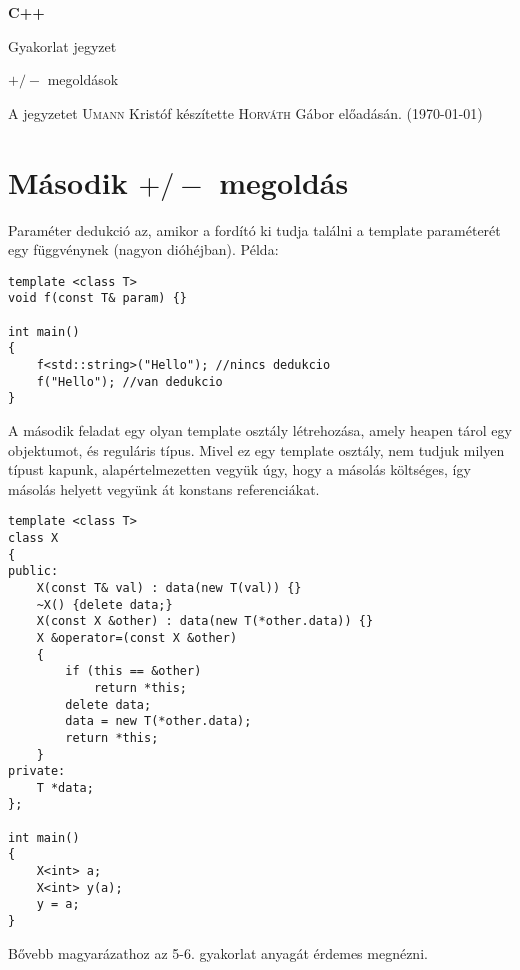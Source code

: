 \documentclass[a4paper,11.5pt]{article}
\begin{document}
	\setlength\parindent{0pt}
	\def\s{\hspace{0.2mm}\vphantom{\beta}}
	\def\Z{\mathbb{Z}}
	\def\Q{\mathbb{Q}}
	\def\R{\mathbb{R}}
	\def\C{\mathbb{C}}
	\def\N{\mathbb{N}}
	\def\Ra{\overline{\mathbb{R}}}
	
	\def\sume{\displaystyle\sum_{n=1}^{+\infty}}
	\def\sumn{\displaystyle\sum_{n=0}^{+\infty}}
	
	\def\narrow{\underset{n\rightarrow+\infty}{\longrightarrow}}
	\def\limn{\displaystyle\lim_{n\to +\infty}}
	\def\limx{\displaystyle\lim_{x\to +\infty}}
	
	\theoremstyle{definition}
	\newtheorem{theorem}{Tétel}[subsection] 
	
	\theoremstyle{definition}
	\newtheorem{definition}[theorem]{Definíció} 
	\newtheorem{example}[theorem]{Példa} 
	\newtheorem{task}[theorem]{Feladat} 
	\newtheorem{note}[theorem]{Megjegyzés}
	\begin{center}
		{\LARGE\textbf{C++}}
		
		{\Large Gyakorlat jegyzet}
		
		$+/-$ megoldások
	\end{center}A jegyzetet \textsc{Umann} Kristóf készítette \textsc{Horváth} Gábor  előadásán. (\today)
	\section{Második $+/-$ megoldás}
	Paraméter dedukció az, amikor a fordító ki tudja találni a template paraméterét egy függvénynek (nagyon dióhéjban). Példa:
	\begin{lstlisting}
template <class T>
void f(const T& param) {}

int main()
{
	f<std::string>("Hello"); //nincs dedukcio
	f("Hello"); //van dedukcio
}
	\end{lstlisting}
	
	A második feladat egy olyan template osztály létrehozása, amely heapen tárol egy objektumot, és reguláris típus. Mivel ez egy template osztály, nem tudjuk milyen típust kapunk, alapértelmezetten vegyük úgy, hogy a másolás költséges, így másolás helyett vegyünk át konstans referenciákat.
	\begin{lstlisting}
template <class T>
class X
{
public:
	X(const T& val) : data(new T(val)) {}
	~X() {delete data;}
	X(const X &other) : data(new T(*other.data)) {}
	X &operator=(const X &other)
	{
		if (this == &other)
			return *this;
		delete data;
		data = new T(*other.data);
		return *this;
	}
private:
	T *data;
};

int main()
{
	X<int> a;
	X<int> y(a);
	y = a;
}
	\end{lstlisting}
	Bővebb magyarázathoz az 5-6. gyakorlat anyagát érdemes megnézni.
	
\end{document}
